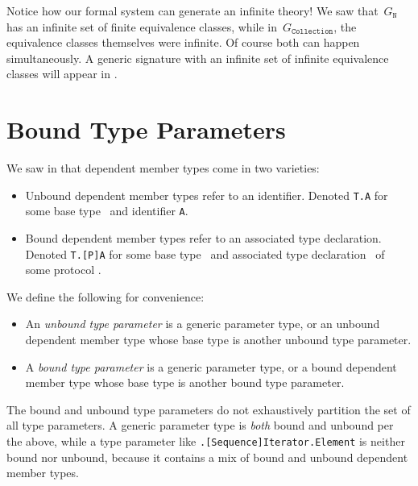 \documentclass[../generics]{subfiles}
\begin{document}
Notice how our formal system can generate an infinite theory! We saw that~$G_\texttt{N}$ has an infinite set of finite equivalence classes, while in~$G_\texttt{Collection}$, the equivalence classes themselves were infinite. Of course both can happen simultaneously. A generic signature with an infinite set of infinite equivalence classes will appear in .

\section{Bound Type Parameters}\label{bound type params}

We saw in  that dependent member types come in two varieties:
\begin{itemize}
\item Unbound dependent member types refer to an identifier. Denoted \texttt{T.A} for some base type \tT\ and identifier \texttt{A}.
\item Bound dependent member types refer to an associated type declaration. Denoted \texttt{T.[P]A} for some base type \tT\ and associated type declaration \nA\ of some protocol \tP.
\end{itemize}

\begin{definition}
We define the following for convenience:
\begin{itemize}
\item An \emph{unbound type parameter} is a generic parameter type, or an unbound dependent member type whose base type is another unbound type parameter.

\item A \emph{bound type parameter} is a generic parameter type, or a bound dependent member type whose base type is another bound type parameter.
\end{itemize}
The bound and unbound type parameters do not exhaustively partition the set of all type parameters. A generic parameter type is \emph{both} bound and unbound per the above, while a type parameter like \texttt{\rT.[Sequence]Iterator.Element} is neither bound nor unbound, because it contains a mix of bound and unbound dependent member types.
\end{definition}
\end{document}

